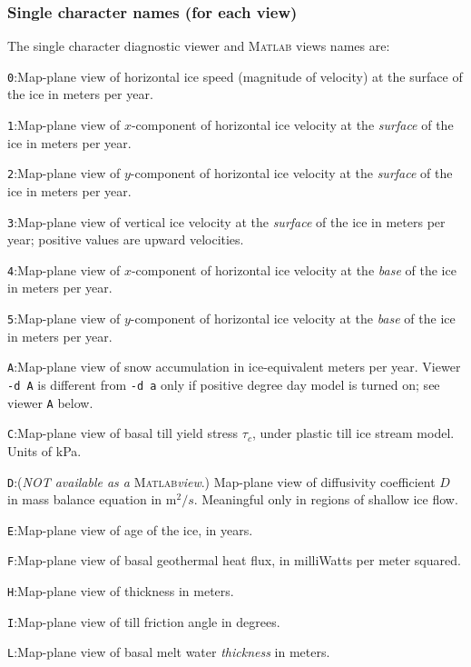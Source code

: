 \documentclass[11pt,final]{amsart}
\newcommand{\Matlab}{\textsc{Matlab}\xspace}
\begin{document}
\subsubsection*{Single character names (for each view)}  The single character diagnostic viewer and \Matlab views names are:
\newcommand{\notMat}{(\emph{NOT available as a} \Matlab \emph{view}.)\xspace\xspace}

\verb|0|:\quad Map-plane view of horizontal ice speed (magnitude of velocity) at the surface of the ice in meters per year.

\verb|1|:\quad Map-plane view of $x$-component of horizontal ice velocity at the \emph{surface} of the ice in meters per year.

\verb|2|:\quad Map-plane view of $y$-component of horizontal ice velocity at the \emph{surface} of the ice in meters per year.

\verb|3|:\quad Map-plane view of vertical ice velocity at the \emph{surface} of the ice in meters per year; positive values are upward velocities.

\verb|4|:\quad Map-plane view of $x$-component of horizontal ice velocity at the \emph{base} of the ice in meters per year.

\verb|5|:\quad Map-plane view of $y$-component of horizontal ice velocity at the \emph{base} of the ice in meters per year.

\verb|A|:\quad Map-plane view of snow accumulation in ice-equivalent meters per year.  Viewer \verb|-d A| is different from \verb|-d a| only if positive degree day model is turned on; see viewer \verb|A| below.

\verb|C|:\quad Map-plane view of basal till yield stress $\tau_c$, under plastic till ice stream model.  Units of kPa.

\verb|D|:\quad \notMat Map-plane view of diffusivity coefficient $D$ in mass balance equation in $\text{m}^2/s$.  Meaningful only in regions of shallow ice flow.

\verb|E|:\quad Map-plane view of age of the ice, in years.

\verb|F|:\quad Map-plane view of basal geothermal heat flux, in milliWatts per meter squared.

\verb|H|:\quad Map-plane view of thickness in meters.

\verb|I|:\quad Map-plane view of till friction angle in degrees.

\verb|L|:\quad Map-plane view of basal melt water \emph{thickness} in meters.
\end{document}
